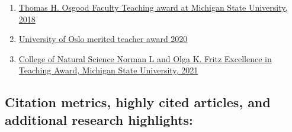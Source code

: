 \documentclass[%
oneside,                 %
final,                   %
10pt]{article}
\begin{document}
\begin{enumerate}
\item \href{{https://web.pa.msu.edu/alumni/awards/osgood_fac_awards.html}}{Thomas H. Osgood Faculty Teaching award at Michigan State University, 2018}

\item \href{{https://titan.uio.no/utdanning/2020/to-fysikere-belonnes-for%

\item \href{{https://natsci.msu.edu/faculty-staff/awards/#eta}}{College of Natural Science Norman L and Olga K. Fritz Excellence in Teaching Award, Michigan State University, 2021}
\end{enumerate}

\noindent
\subsection{Citation metrics, highly cited articles, and additional research highlights:}
\end{document}
